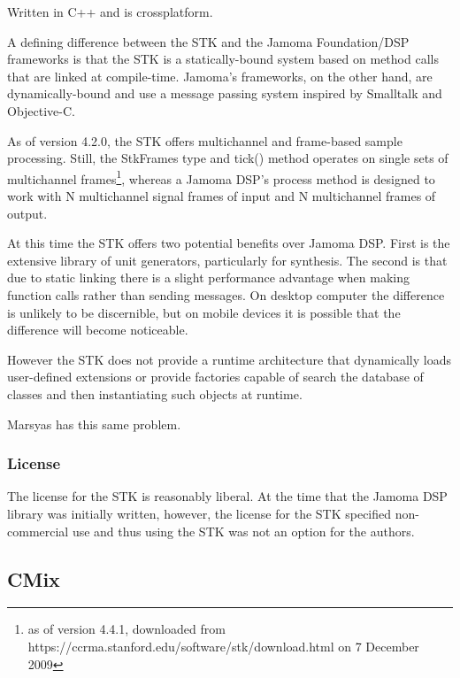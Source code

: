 \documentclass[twoside,10pt]{article}
\begin{document}
Written in C++ and is crossplatform.


A defining difference between the STK and the Jamoma Foundation/DSP frameworks is that the STK is a statically-bound system based on method calls that are linked at compile-time.  Jamoma's frameworks, on the other hand, are dynamically-bound and use a message passing system inspired by Smalltalk\cite{Krasner:1988} and Objective-C\cite{Cox:1986}.

As of version 4.2.0, the STK offers multichannel and frame-based sample processing\cite{Scavone:2005}. Still, the StkFrames type and tick() method operates on single sets of multichannel frames\footnote{as of version 4.4.1, downloaded from https://ccrma.stanford.edu/software/stk/download.html on 7 December 2009}, whereas a Jamoma DSP's process method is designed to work with N multichannel signal frames of input and N multichannel frames of output.

At this time the STK offers two potential benefits over Jamoma DSP.  First is the extensive library of unit generators, particularly for synthesis.  The second is that due to static linking there is a slight performance advantage when making function calls rather than sending messages.  On desktop computer the difference is unlikely to be discernible, but on mobile devices it is possible that the difference will become noticeable.

However the STK does not provide a runtime architecture that dynamically loads user-defined extensions or provide factories capable of search the database of classes and then instantiating such objects at runtime.

Marsyas has this same problem.  



\subsubsection{License}
The license for the STK is reasonably liberal.  At the time that the Jamoma DSP library was initially written, however, the license for the STK specified non-commercial use and thus using the STK was not an option for the authors.  


\subsection{CMix} %
\end{document}
